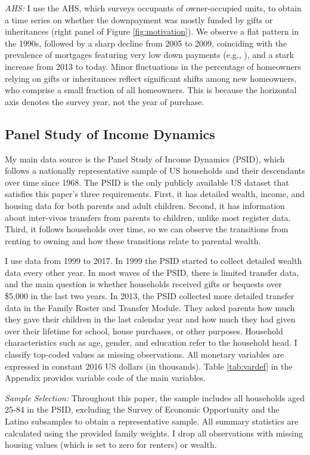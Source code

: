 \documentclass[12pt]{article}
\begin{document}
\textit{AHS:} I use the AHS, which surveys occupants of owner-occupied units, to obtain a time series on whether the downpayment was mostly funded by gifts or inheritances (right panel of  Figure \ref{fig:motivation}). We observe a flat pattern in the 1990s, followed by a sharp decline from 2005 to 2009, coinciding with the prevalence of mortgages featuring very low down payments (e.g., \cite{Corbae2015}), and a stark increase from 2013 to today. Minor fluctuations in the percentage of homeowners relying on gifts or inheritances reflect significant shifts among new homeowners, who comprise a small fraction of all homeowners. This is because the horizontal axis denotes the survey year, not the year of purchase.


\subsection{Panel Study of Income Dynamics}\label{sec:PSID}
My main data source is the Panel Study of Income Dynamics (PSID), which follows a nationally representative sample of US households and their descendants over time since 1968. The PSID is the only publicly available US dataset that satisfies this paper's three requirements. First, it has detailed wealth, income, and housing data for both parents and adult children. Second, it has information about inter-vivos transfers from parents to children, unlike most register data. Third, it follows households over time, so we can observe the transitions from renting to owning and how these transitions relate to parental wealth.

I use data from 1999 to 2017. In 1999 the PSID started to collect detailed wealth data every other year. In most waves of the PSID, there is limited transfer data, and the main question is whether households received gifts or bequests over \$5,000  in the last two years. In 2013, the PSID collected more detailed transfer data in the Family Roster and Transfer Module. They asked parents how much they gave their children in the last calendar year and how much they had given over their lifetime for school, house purchases, or other purposes. Household characteristics such as age, gender, and education refer to the household head. I classify top-coded values as missing observations. All monetary variables are expressed in constant 2016 US dollars (in thousands). Table \ref{tab:vardef} in the Appendix provides variable code of the main variables.

\textit{Sample Selection:} Throughout this paper, the sample includes all households aged 25-84 in the PSID, excluding the Survey of Economic Opportunity and the Latino subsamples to obtain a representative sample. All summary statistics are calculated using the provided family weights. I drop all observations with missing housing values (which is set to zero for renters) or wealth.
\end{document}

